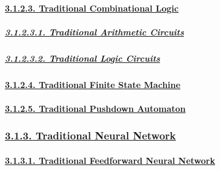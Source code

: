 \documentclass[
]{article}
\begin{document}
\hypertarget{traditional-combinational-logic}{%
\paragraph{\texorpdfstring{\protect\hyperlink{traditional-combinational-logic-1}{3.1.2.3.
Traditional Combinational
Logic}}{3.1.2.3. Traditional Combinational Logic}}\label{traditional-combinational-logic}}

\hypertarget{traditional-arithmetic-circuits}{%
\subparagraph{\texorpdfstring{\protect\hyperlink{traditional-arithmetic-circuits-1}{3.1.2.3.1.
Traditional Arithmetic
Circuits}}{3.1.2.3.1. Traditional Arithmetic Circuits}}\label{traditional-arithmetic-circuits}}

\hypertarget{traditional-logic-circuits}{%
\subparagraph{\texorpdfstring{\protect\hyperlink{traditional-logic-circuits-1}{3.1.2.3.2.
Traditional Logic
Circuits}}{3.1.2.3.2. Traditional Logic Circuits}}\label{traditional-logic-circuits}}

\hypertarget{traditional-finite-state-machine}{%
\paragraph{\texorpdfstring{\protect\hyperlink{traditional-finite-state-machine-1}{3.1.2.4.
Traditional Finite State
Machine}}{3.1.2.4. Traditional Finite State Machine}}\label{traditional-finite-state-machine}}

\hypertarget{traditional-pushdown-automaton}{%
\paragraph{\texorpdfstring{\protect\hyperlink{traditional-pushdown-automaton-1}{3.1.2.5.
Traditional Pushdown
Automaton}}{3.1.2.5. Traditional Pushdown Automaton}}\label{traditional-pushdown-automaton}}

\hypertarget{traditional-neural-network}{%
\subsubsection{\texorpdfstring{\protect\hyperlink{traditional-neural-network-1}{3.1.3.
Traditional Neural
Network}}{3.1.3. Traditional Neural Network}}\label{traditional-neural-network}}

\hypertarget{traditional-feedforward-neural-network}{%
\paragraph{\texorpdfstring{\protect\hyperlink{traditional-feedforward-neural-network-1}{3.1.3.1.
Traditional Feedforward Neural
Network}}{3.1.3.1. Traditional Feedforward Neural Network}}\label{traditional-feedforward-neural-network}}
\end{document}
